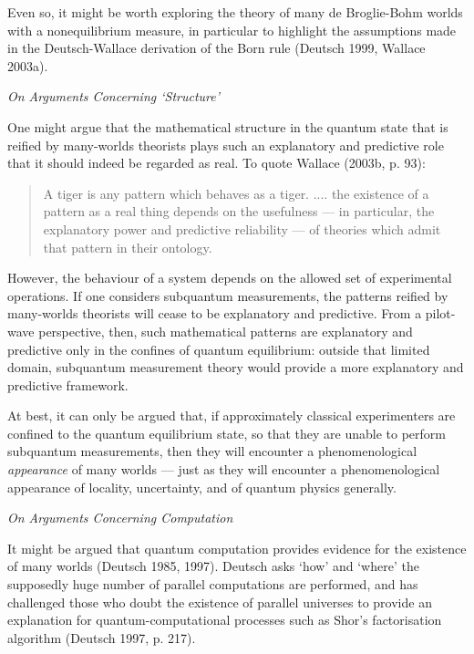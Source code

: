 \documentclass{article}%
\begin{document}
Even so, it might be worth exploring the theory of many de Broglie-Bohm worlds
with a nonequilibrium measure, in particular to highlight the assumptions made
in the Deutsch-Wallace derivation of the Born rule (Deutsch 1999, Wallace 2003a).

\begin{center}
\textit{On Arguments Concerning `Structure'}
\end{center}

One might argue that the mathematical structure in the quantum state that is
reified by many-worlds theorists plays such an explanatory and predictive role
that it should indeed be regarded as real. To quote Wallace (2003b, p. 93):

\begin{quote}
A tiger is any pattern which behaves as a tiger. .... the existence of a
pattern as a real thing depends on the usefulness --- in particular, the
explanatory power and predictive reliability --- of theories which admit that
pattern in their ontology.
\end{quote}

However, the behaviour of a system depends on the allowed set of experimental
operations. If one considers subquantum measurements, the patterns reified by
many-worlds theorists will cease to be explanatory and predictive. From a
pilot-wave perspective, then, such mathematical patterns are explanatory and
predictive only in the confines of quantum equilibrium: outside that limited
domain, subquantum measurement theory would provide a more explanatory and
predictive framework.

At best, it can only be argued that, if approximately classical experimenters
are confined to the quantum equilibrium state, so that they are unable to
perform subquantum measurements, then they will encounter a phenomenological
\textit{appearance} of many worlds --- just as they will encounter a
phenomenological appearance of locality, uncertainty, and of quantum physics generally.

\begin{center}
\textit{On Arguments Concerning Computation}
\end{center}

It might be argued that quantum computation provides evidence for the
existence of many worlds (Deutsch 1985, 1997). Deutsch asks `how' and `where'
the supposedly huge number of parallel computations are performed, and has
challenged those who doubt the existence of parallel universes to provide an
explanation for quantum-computational processes such as Shor's factorisation
algorithm (Deutsch 1997, p. 217).
\end{document}
